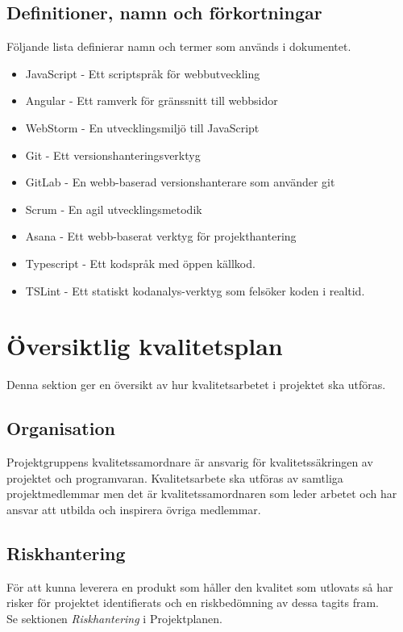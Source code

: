 \documentclass[a4paper,10pt]{article}
\begin{document}
\subsection{Definitioner, namn och förkortningar}
Följande lista definierar namn och termer som används i dokumentet.
\begin{itemize}
    \item JavaScript - Ett scriptspråk för webbutveckling
    \item Angular - Ett ramverk för gränssnitt till webbsidor
    \item WebStorm - En utvecklingsmiljö till JavaScript
    \item Git - Ett versionshanteringsverktyg
    \item GitLab - En webb-baserad versionshanterare som använder git
    \item Scrum - En agil utvecklingsmetodik
    \item Asana - Ett webb-baserat verktyg för projekthantering
    \item Typescript - Ett kodspråk med öppen källkod.
    \item TSLint - Ett statiskt kodanalys-verktyg som felsöker koden i realtid.
\end{itemize}

\section{Översiktlig kvalitetsplan}
Denna sektion ger en översikt av hur kvalitetsarbetet i projektet ska utföras.

\subsection{Organisation}

Projektgruppens kvalitetssamordnare är ansvarig för kvalitetssäkringen av projektet och  programvaran. Kvalitetsarbete ska utföras av samtliga projektmedlemmar men det är kvalitetssamordnaren som leder arbetet och har ansvar att utbilda och inspirera övriga medlemmar.

\subsection{Riskhantering}

För att kunna leverera en produkt som håller den kvalitet som utlovats så har risker för projektet identifierats och en riskbedömning av dessa tagits fram. \\
Se sektionen \emph{Riskhantering} i Projektplanen.
\end{document}
